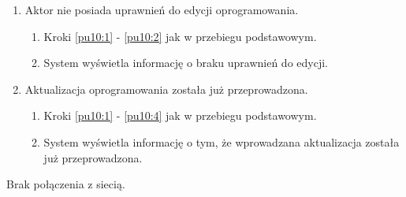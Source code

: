 \begin{enumerate}
	\item Aktor nie posiada uprawnień do edycji oprogramowania.
	\begin{enumerate}[label*=\arabic*.]
		\item Kroki \ref{pu10:1} - \ref{pu10:2} jak w przebiegu podstawowym.
		\item System wyświetla informację o braku uprawnień do edycji.
	\end{enumerate}
	\item Aktualizacja oprogramowania została już przeprowadzona.
	\begin{enumerate}[label*=\arabic*.]
		\item Kroki \ref{pu10:1} - \ref{pu10:4} jak w przebiegu podstawowym.
		\item System wyświetla informację o tym, że wprowadzana aktualizacja została już przeprowadzona.
	\end{enumerate}
\end{enumerate}

Brak połączenia z siecią.

